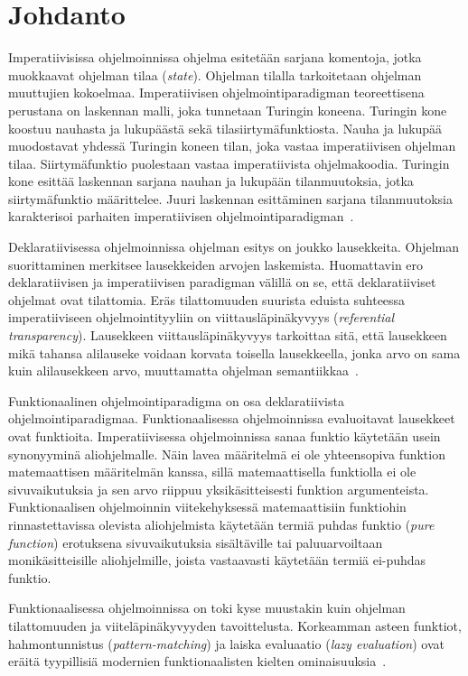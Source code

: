 \section{Johdanto}

Imperatiivisissa ohjelmoinnissa ohjelma esitetään sarjana komentoja, jotka muokkaavat ohjelman tilaa (\textit{state}). Ohjelman tilalla tarkoitetaan ohjelman muuttujien kokoelmaa. Imperatiivisen ohjelmointiparadigman teoreettisena perustana on laskennan malli, joka tunnetaan Turingin koneena. Turingin kone koostuu nauhasta ja lukupäästä sekä tilasiirtymäfunktiosta. Nauha ja lukupää muodostavat yhdessä Turingin koneen tilan, joka vastaa imperatiivisen ohjelman tilaa. Siirtymäfunktio puolestaan vastaa imperatiivista ohjelmakoodia. Turingin kone esittää laskennan sarjana nauhan ja lukupään tilanmuutoksia, jotka siirtymäfunktio määrittelee. Juuri laskennan esittäminen sarjana tilanmuutoksia karakterisoi parhaiten imperatiivisen ohjelmointiparadigman~\cite[s.~3]{Hudak89}.
\par
Deklaratiivisessa ohjelmoinnissa ohjelman esitys on joukko lausekkeita. Ohjelman suorittaminen merkitsee lausekkeiden arvojen laskemista. Huomattavin ero deklaratiivisen ja imperatiivisen paradigman välillä on se, että deklaratiiviset ohjelmat ovat tilattomia. Eräs tilattomuuden suurista eduista suhteessa imperatiiviseen ohjelmointityyliin on viittausläpinäkyvyys (\textit{referential transparency}). Lausekkeen viittausläpinäkyvyys tarkoittaa sitä, että lausekkeen mikä tahansa alilauseke voidaan korvata toisella lausekkeella, jonka arvo on sama kuin alilausekkeen arvo, muuttamatta ohjelman semantiikkaa~\cite[s.~5]{Hudak89}.
\par
Funktionaalinen ohjelmointiparadigma on osa deklaratiivista ohjelmointiparadigmaa. Funktionaalisessa ohjelmoinnissa evaluoitavat lausekkeet ovat funktioita. Imperatiivisessa ohjelmoinnissa sanaa funktio käytetään usein synonyyminä aliohjelmalle. Näin lavea määritelmä ei ole yhteensopiva funktion matemaattisen määritelmän kanssa, sillä matemaattisella funktiolla ei ole sivuvaikutuksia ja sen arvo riippuu yksikäsitteisesti funktion argumenteista. Funktionaalisen ohjelmoinnin viitekehyksessä matemaattisiin funktiohin rinnastettavissa olevista aliohjelmista käytetään termiä puhdas funktio (\textit{pure function}) erotuksena sivuvaikutuksia sisältäville tai paluuarvoiltaan monikäsitteisille aliohjelmille, joista vastaavasti käytetään termiä ei-puhdas funktio.  
\par
Funktionaalisessa ohjelmoinnissa on toki kyse muustakin kuin ohjelman tilattomuuden ja viiteläpinäkyvyyden tavoittelusta. Korkeamman asteen funktiot, hahmontunnistus (\textit{pattern-matching}) ja laiska evaluaatio (\textit{lazy evaluation}) ovat eräitä tyypillisiä modernien funktionaalisten kielten ominaisuuksia~\cite{Hudak89}.  
